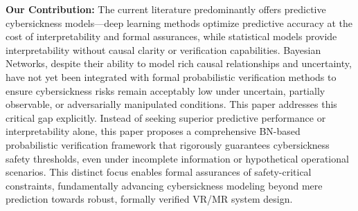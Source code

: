 \documentclass{vgtc}                          %
\begin{document}
\begin{mybox}
\textbf{Our Contribution:} The current literature predominantly offers predictive cybersickness models—deep learning methods optimize predictive accuracy at the cost of interpretability and formal assurances, while statistical models provide interpretability without causal clarity or verification capabilities. Bayesian Networks, despite their ability to model rich causal relationships and uncertainty, have not yet been integrated with formal probabilistic verification methods to ensure cybersickness risks remain acceptably low under uncertain, partially observable, or adversarially manipulated conditions. This paper addresses this critical gap explicitly. Instead of seeking superior predictive performance or interpretability alone, this paper proposes a comprehensive BN-based probabilistic verification framework that rigorously guarantees cybersickness safety thresholds, even under incomplete information or hypothetical operational scenarios. This distinct focus enables formal assurances of safety-critical constraints, fundamentally advancing cybersickness modeling beyond mere prediction towards robust, formally verified VR/MR system design.
\end{mybox}




\end{document}
